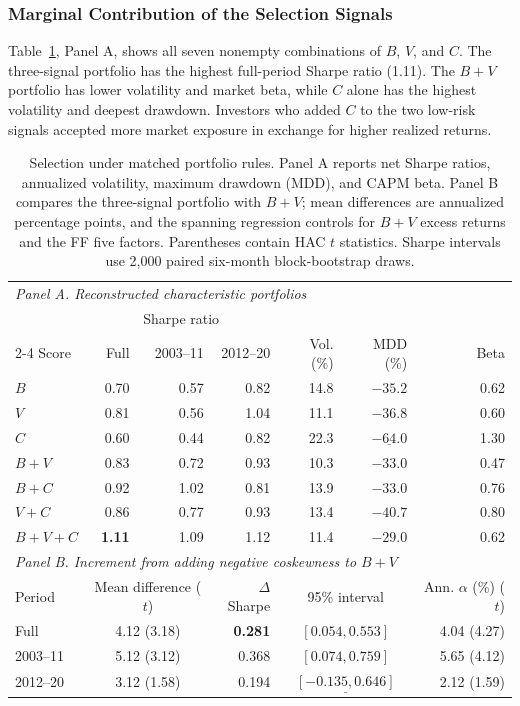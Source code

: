 \documentclass[letterpaper,journal]{IEEEtran}
\begin{document}
\subsubsection{Marginal Contribution of the Selection Signals}\label{sec:signalcomparisons}
Table~\ref{tab:archive}, Panel A, shows all seven nonempty combinations of $B$, $V$, and $C$. The three-signal portfolio has the highest full-period Sharpe ratio (1.11). The $B+V$ portfolio has lower volatility and market beta, while $C$ alone has the highest volatility and deepest drawdown. Investors who added $C$ to the two low-risk signals accepted more market exposure in exchange for higher realized returns.

\begin{table}[t]\centering
\caption{Selection under matched portfolio rules. Panel A reports net Sharpe ratios, annualized volatility, maximum drawdown (MDD), and CAPM beta. Panel B compares the three-signal portfolio with $B+V$; mean differences are annualized percentage points, and the spanning regression controls for $B+V$ excess returns and the FF five factors. Parentheses contain HAC $t$ statistics. Sharpe intervals use 2,000 paired six-month block-bootstrap draws.}\label{tab:archive}
\small
\begin{tabular}{lrrrrrr}\toprule
\multicolumn{7}{l}{\textit{Panel A. Reconstructed characteristic portfolios}}\\
 & \multicolumn{3}{c}{Sharpe ratio} & & & \\
\cmidrule(lr){2-4}
Score & Full & 2003--11 & 2012--20 & Vol. (\%) & MDD (\%) & Beta\\\midrule
$B$ & 0.70 & 0.57 & 0.82 & 14.8 & $-35.2$ & 0.62\\
$V$ & 0.81 & 0.56 & 1.04 & 11.1 & $-36.8$ & 0.60\\
$C$ & 0.60 & 0.44 & 0.82 & 22.3 & $\underline{-64.0}$ & 1.30\\
$B+V$ & 0.83 & 0.72 & 0.93 & 10.3 & $-33.0$ & 0.47\\
$B+C$ & 0.92 & 1.02 & 0.81 & 13.9 & $-33.0$ & 0.76\\
$V+C$ & 0.86 & 0.77 & 0.93 & 13.4 & $-40.7$ & 0.80\\
$B+V+C$ & \textbf{1.11} & 1.09 & 1.12 & 11.4 & $-29.0$ & 0.62\\
\midrule
\multicolumn{7}{l}{\textit{Panel B. Increment from adding negative coskewness to $B+V$}}\\
Period & \multicolumn{2}{c}{Mean difference ($t$)} & $\Delta$Sharpe & \multicolumn{2}{c}{95\% interval} & Ann. $\alpha$ (\%) ($t$)\\\midrule
Full & \multicolumn{2}{c}{4.12 (3.18)} & \textbf{0.281} & \multicolumn{2}{c}{$[0.054,0.553]$} & 4.04 (4.27)\\
2003--11 & \multicolumn{2}{c}{5.12 (3.12)} & 0.368 & \multicolumn{2}{c}{$[0.074,0.759]$} & 5.65 (4.12)\\
2012--20 & \multicolumn{2}{c}{3.12 (1.58)} & 0.194 & \multicolumn{2}{c}{$\underline{[-0.135,0.646]}$} & 2.12 (1.59)\\
\bottomrule
\end{tabular}
\end{table}
\end{document}
